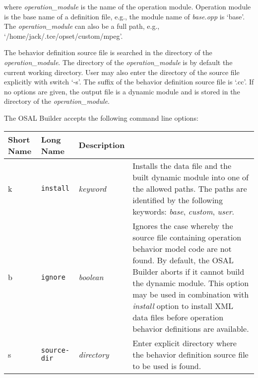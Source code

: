 \documentclass[twoside]{tceusermanual}
\begin{document}

where \emph{operation\_module} is the name of the operation module. 
Operation module is the base name of a definition file, e.g., the module
name of \emph{base.opp} is `base'. The \emph{operation\_module} can also be
a full path, e.g., `/home/jack/.tce/opset/custom/mpeg'.

The behavior definition source file is searched in the directory of the
\emph{operation\_module}. The directory of the \emph{operation\_module} is
by 
default the current working directory. User may also enter the directory of
the source file explicitly with switch `-s'. The suffix of the
behavior definition source file is `.cc'.
%
If no options are given, the output file is a dynamic module and is stored
in the directory of the \emph{operation\_module}.  

The OSAL Builder accepts the following command line options:

\begin{center}
\begin{longtable}[htb]{@{}p{}@{}p{}@{}p{}%
                     @{}p{}}

\textbf{Short Name} &\textbf{Long Name} &\textbf{Description} \\
\hline

k & \verb|install|        & \emph{keyword} &

Installs the data file and the built dynamic module into one of the allowed
paths. The paths are identified by the following keywords: 
\emph{base}, \emph{custom}, \emph{user}.\\

b & \verb|ignore|         & \emph{boolean} &

Ignores the case whereby the source file containing operation behavior model
code are not found.  By default, the OSAL Builder aborts if it cannot build
the dynamic module.  This option may be used in combination with
\emph{install} option to install XML data files before operation behavior
definitions are available.\\

s & \verb|source-dir|         & \emph{directory} &

Enter explicit directory where the behavior definition source file to
be used is found.

\end{longtable}
\end{center}
\end{document}
